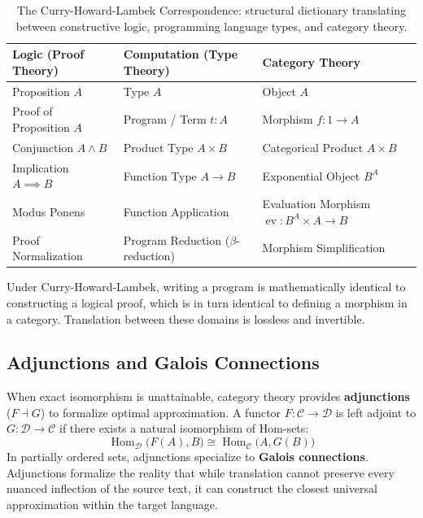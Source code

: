 \documentclass[11pt,letterpaper]{article}
\begin{document}
\begin{table}[htbp]
\centering
\small
\begin{tabular}{lll}
\toprule
\textbf{Logic (Proof Theory)} & \textbf{Computation (Type Theory)} & \textbf{Category Theory} \\
\midrule
Proposition $A$ & Type $A$ & Object $A$ \\
Proof of Proposition $A$ & Program / Term $t : A$ & Morphism $f: 1 \to A$ \\
Conjunction $A \land B$ & Product Type $A \times B$ & Categorical Product $A \times B$ \\
Implication $A \implies B$ & Function Type $A \to B$ & Exponential Object $B^A$ \\
Modus Ponens & Function Application & Evaluation Morphism $\operatorname{ev}: B^A \times A \to B$ \\
Proof Normalization & Program Reduction ($\beta$-reduction) & Morphism Simplification \\
\bottomrule
\end{tabular}
\caption{The Curry-Howard-Lambek Correspondence: structural dictionary translating between constructive logic, programming language types, and category theory.}
\label{tab:curry_howard}
\end{table}

Under Curry-Howard-Lambek, writing a program is mathematically identical to constructing a logical proof, which is in turn identical to defining a morphism in a category. Translation between these domains is lossless and invertible.

\subsection{Adjunctions and Galois Connections}
When exact isomorphism is unattainable, category theory provides \textbf{adjunctions} ($F \dashv G$) to formalize optimal approximation. A functor $F: \mathcal{C} \to \mathcal{D}$ is left adjoint to $G: \mathcal{D} \to \mathcal{C}$ if there exists a natural isomorphism of Hom-sets:
\begin{equation}
\operatorname{Hom}_{\mathcal{D}}\big(F(A), B\big) \cong \operatorname{Hom}_{\mathcal{C}}\big(A, G(B)\big)
\end{equation}
In partially ordered sets, adjunctions specialize to \textbf{Galois connections}. Adjunctions formalize the reality that while translation cannot preserve every nuanced inflection of the source text, it can construct the closest universal approximation within the target language.
\end{document}
